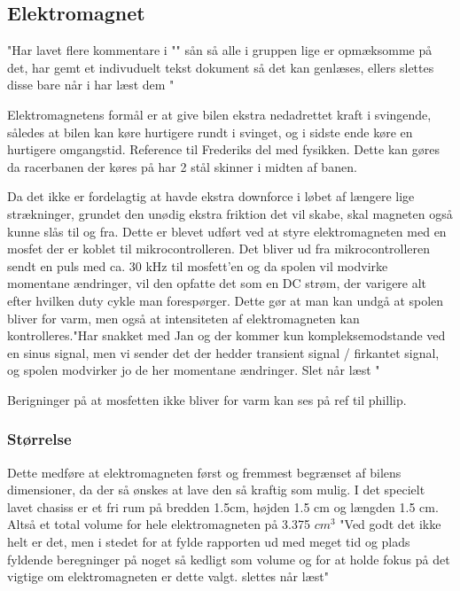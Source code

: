 
\subsection{Elektromagnet}
\label{Elektromagnet}

"Har lavet flere kommentare i "" sån så alle i gruppen lige er opmæksomme på det, har gemt et indivuduelt tekst dokument så det kan genlæses, ellers slettes disse bare når i har læst dem "

Elektromagnetens formål er at give bilen ekstra nedadrettet kraft i svingende, således at bilen kan køre hurtigere rundt i svinget, og i sidste ende køre en hurtigere omgangstid. Reference til Frederiks del med fysikken. Dette kan gøres da racerbanen der køres på har 2 stål skinner i midten af banen.

Da det ikke er fordelagtig at havde ekstra downforce i løbet af længere lige strækninger, grundet den unødig ekstra friktion det vil skabe, skal magneten også kunne slås til og fra. Dette er blevet udført ved at styre elektromagneten med en mosfet der er koblet til mikrocontrolleren. Det bliver ud fra mikrocontrolleren sendt en puls med ca. 30 kHz til mosfett’en og da spolen vil modvirke momentane ændringer, vil den opfatte det som en DC strøm, der varigere alt efter hvilken duty cykle man forespørger. Dette gør at man kan undgå at spolen bliver for varm, men også at intensiteten af elektromagneten kan kontrolleres."Har snakket med Jan og der kommer kun kompleksemodstande ved en sinus signal, men vi sender det der hedder transient signal / firkantet signal, og spolen modvirker jo de her momentane ændringer. Slet når læst "

Berigninger på at mosfetten ikke bliver for varm kan ses på ref til phillip.

\subsubsection{Størrelse}

Dette medføre at elektromagneten først og fremmest begrænset af bilens dimensioner, da der så ønskes at lave den så kraftig som mulig. I det specielt lavet chasiss er et fri rum på bredden 1.5cm, højden 1.5 cm og længden 1.5 cm. Altså et total volume for hele elektromagneten på 3.375 $cm^3$ "Ved godt det ikke helt er det, men i stedet for at fylde rapporten ud med meget tid og plads fyldende beregninger på noget så kedligt som volume og for at holde fokus på det vigtige om elektromagneten er dette valgt. slettes når læst"

